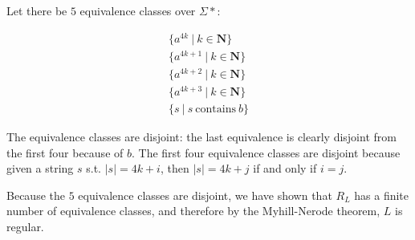 \documentclass{article}
\begin{document}
\noindent Let there be $5$ equivalence classes over $\Sigma *$:

\begin{align*}
    \{a^{4k}  \ | \ k \in \mathbf{N} \}
    \\ \{a^{4k+1}  \ | \ k \in \mathbf{N} \}
    \\ \{a^{4k+2}  \ | \ k \in \mathbf{N} \}
    \\ \{a^{4k+3}  \ | \ k \in \mathbf{N} \}
    \\ \{ s \ | \ s \ \text{contains} \ b \}
\end{align*}

\noindent The equivalence classes are disjoint: the last equivalence is clearly disjoint from the first four because of $b$. The first four equivalence classes are disjoint because given a string $s$ s.t. $|s| = 4k+i$, then $|s| = 4k+j$ if and only if $i=j$.

\noindent Because the $5$ equivalence classes are disjoint, we have shown that $R_L$ has a finite number of equivalence classes, and therefore by the Myhill-Nerode theorem, $L$ is regular.
\end{document}

